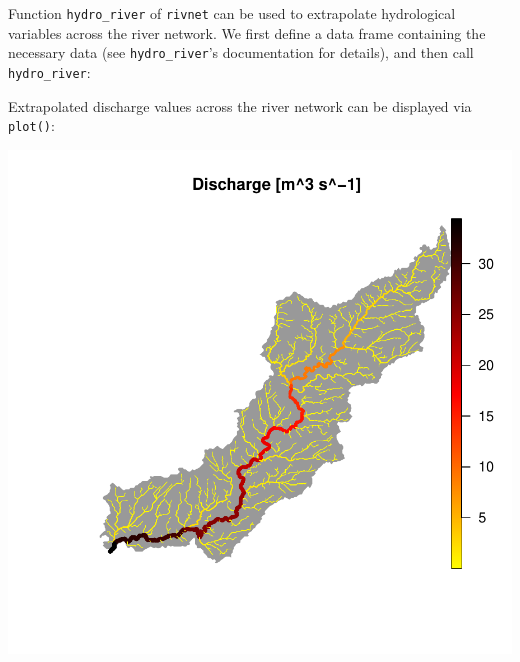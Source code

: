 \documentclass[
]{article}
\newenvironment{Shaded}{\begin{snugshade}}{\end{snugshade}}
\newcommand{\AttributeTok}[1]{\textcolor[rgb]{0.13,0.29,0.53}{#1}}
\newcommand{\DecValTok}[1]{\textcolor[rgb]{0.00,0.00,0.81}{#1}}
\newcommand{\FunctionTok}[1]{\textcolor[rgb]{0.13,0.29,0.53}{\textbf{#1}}}
\newcommand{\NormalTok}[1]{#1}
\newcommand{\OtherTok}[1]{\textcolor[rgb]{0.56,0.35,0.01}{#1}}
\newcommand{\SpecialCharTok}[1]{\textcolor[rgb]{0.81,0.36,0.00}{\textbf{#1}}}
\newcommand{\StringTok}[1]{\textcolor[rgb]{0.31,0.60,0.02}{#1}}
\begin{document}
Function \texttt{hydro\_river} of \texttt{rivnet} can be used to extrapolate hydrological variables across the river network. We first define a data frame containing the necessary data (see \texttt{hydro\_river}'s documentation for details), and then call \texttt{hydro\_river}:

\begin{Shaded}
\end{Shaded}

Extrapolated discharge values across the river network can be displayed via \texttt{plot()}:

\begin{Shaded}
\end{Shaded}

\includegraphics{Illustrating_eDITH_files/figure-latex/unnamed-chunk-9-1.pdf}
\end{document}
